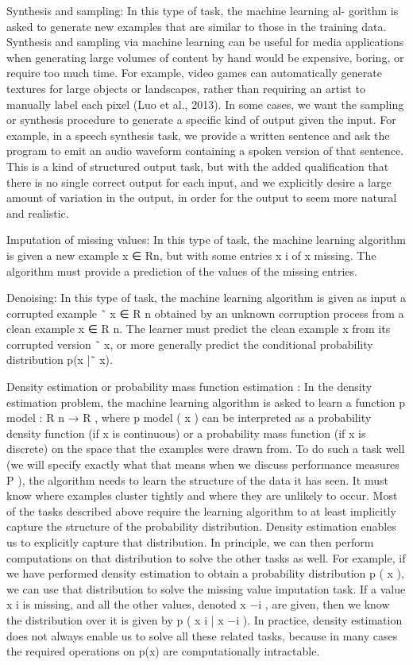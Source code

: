 \documentclass[11pt]{article}
\begin{document}
Synthesis and sampling: In this type of task, the machine learning al-
gorithm is asked to generate new examples that are similar to those in the
training data. Synthesis and sampling via machine learning can be useful
for media applications when generating large volumes of content by hand
would be expensive, boring, or require too much time. For example, video
games can automatically generate textures for large objects or landscapes,
rather than requiring an artist to manually label each pixel (Luo et al., 2013).
In some cases, we want the sampling or synthesis procedure to generate a
speciﬁc kind of output given the input. For example, in a speech synthesis
task, we provide a written sentence and ask the program to emit an audio
waveform containing a spoken version of that sentence. This is a kind of
structured output task, but with the added qualiﬁcation that there is no
single correct output for each input, and we explicitly desire a large amount
of variation in the output, in order for the output to seem more natural and
realistic.

Imputation of missing values: In this type of task, the machine learning
algorithm is given a new example x ∈ Rn, but with some entries x i of x
missing. The algorithm must provide a prediction of the values of the missing
entries.

Denoising: In this type of task, the machine learning algorithm is given as input a corrupted example ˜ x ∈ R n obtained by an unknown corruption process from a clean example x ∈ R n. The learner must predict the clean example x from its corrupted version ˜ x, or more generally predict the conditional probability distribution p(x |˜ x).

Density estimation
or
probability mass function estimation
: In the
density estimation problem, the machine learning algorithm is asked to learn a
function
p
model
:
R
n
→ R
, where
p
model
(
x
) can be interpreted as a probability
density function (if
x
is continuous) or a probability mass function (if
x
is
discrete) on the space that the examples were drawn from. To do such a task
well (we will specify exactly what that means when we discuss performance
measures
P
), the algorithm needs to learn the structure of the data it has seen.
It must know where examples cluster tightly and where they are unlikely to
occur. Most of the tasks described above require the learning algorithm to at
least implicitly capture the structure of the probability distribution. Density
estimation enables us to explicitly capture that distribution. In principle,
we can then perform computations on that distribution to solve the other
tasks as well. For example, if we have performed density estimation to obtain
a probability distribution
p
(
x
), we can use that distribution to solve the
missing value imputation task. If a value
x
i
is missing, and all the other
values, denoted
x
−i
, are given, then we know the distribution over it is given
by
p
(
x
i
| x
−i
). In practice, density estimation does not always enable us to
solve all these related tasks, because in many cases the required operations
on p(x) are computationally intractable.
\end{document}
